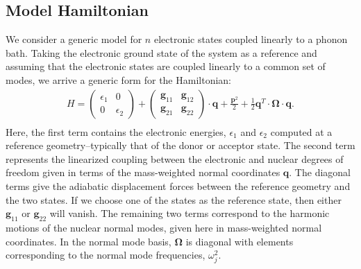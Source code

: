 \subsection{Model Hamiltonian}
We consider a generic model for $n$ electronic states coupled linearly
to a phonon bath.  Taking the electronic ground state of the system as a reference
and assuming that the electronic states are coupled linearly to a common set of
 modes, we arrive a generic form for the Hamiltonian:
 \begin{eqnarray}
H=\left(\begin{array}{cc}
\epsilon_{1} & 0\\
0 & \epsilon_{2}
\end{array}\right)+\left(\begin{array}{cc}
{\mathbf g}_{11}&{\mathbf g}_{12} \\
{\mathbf g}_{21} &{\mathbf g}_{22}
\end{array}\right)\cdot{\mathbf q} +\frac{{\mathbf p}^{2}}{2}+\frac{1}{2}\mathbf{q}^{T}\cdot\mathbf\Omega\cdot\mathbf{q}.
\nonumber \\
\label{ham1}
\end{eqnarray}
Here, the first term contains the electronic energies, $\epsilon_{1}$ and $\epsilon_{2}$ computed at a
reference geometry--typically that of the donor or acceptor state.   The second term represents the
linearized coupling between the electronic and nuclear degrees of freedom given in terms of the mass-weighted
normal coordinates $\mathbf q$.   The diagonal terms
give the adiabatic displacement forces between the reference geometry and the two states.  If we choose one of the
states as the reference state, then either $\mathbf g_{11}$ or $\mathbf g_{22}$ will vanish.
The remaining two terms correspond to the harmonic motions of the nuclear normal modes, given here in mass-weighted normal coordinates.
In the normal mode basis, $\mathbf \Omega$  is diagonal with elements corresponding to the normal mode frequencies, $\omega_{j}^{2}$.


